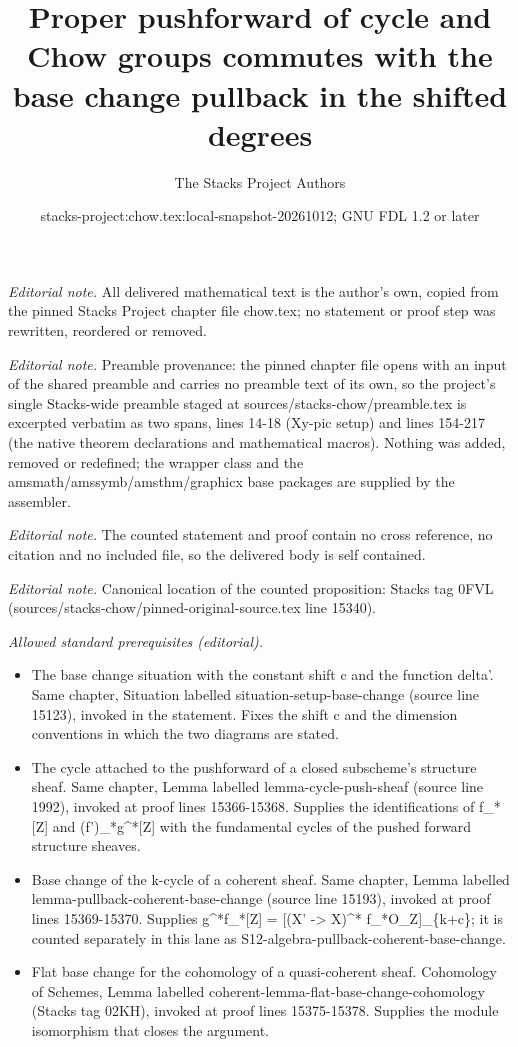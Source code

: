\documentclass[10pt,a4paper]{amsart}
\title{Proper pushforward of cycle and Chow groups commutes with the base change pullback in the shifted degrees}
\author{The Stacks Project Authors}
\date{stacks-project:chow.tex:local-snapshot-20261012; GNU FDL 1.2 or later}
\theoremstyle{plain}
\theoremstyle{definition}
\theoremstyle{remark}
\numberwithin{equation}{subsection}
\begin{document}
\maketitle
\noindent\textit{Editorial note.} All delivered mathematical text is the author's own, copied from the pinned Stacks Project chapter file chow.tex; no statement or proof step was rewritten, reordered or removed.\par\medskip
\noindent\textit{Editorial note.} Preamble provenance: the pinned chapter file opens with an input of the shared preamble and carries no preamble text of its own, so the project's single Stacks-wide preamble staged at sources/stacks-chow/preamble.tex is excerpted verbatim as two spans, lines 14-18 (Xy-pic setup) and lines 154-217 (the native theorem declarations and mathematical macros). Nothing was added, removed or redefined; the wrapper class and the amsmath/amssymb/amsthm/graphicx base packages are supplied by the assembler.\par\medskip
\noindent\textit{Editorial note.} The counted statement and proof contain no cross reference, no citation and no included file, so the delivered body is self contained.\par\medskip
\noindent\textit{Editorial note.} Canonical location of the counted proposition: Stacks tag 0FVL (sources/stacks-chow/pinned-original-source.tex line 15340).\par\medskip
\noindent\textit{Allowed standard prerequisites (editorial).}\begin{itemize}
\item The base change situation with the constant shift c and the function delta'. Same chapter, Situation labelled situation-setup-base-change (source line 15123), invoked in the statement. Fixes the shift c and the dimension conventions in which the two diagrams are stated.
\item The cycle attached to the pushforward of a closed subscheme's structure sheaf. Same chapter, Lemma labelled lemma-cycle-push-sheaf (source line 1992), invoked at proof lines 15366-15368. Supplies the identifications of f\_*[Z] and (f')\_*g\textasciicircum{}*[Z] with the fundamental cycles of the pushed forward structure sheaves.
\item Base change of the k-cycle of a coherent sheaf. Same chapter, Lemma labelled lemma-pullback-coherent-base-change (source line 15193), invoked at proof lines 15369-15370. Supplies g\textasciicircum{}*f\_*[Z] = [(X' -> X)\textasciicircum{}* f\_*O\_Z]\_\{k+c\}; it is counted separately in this lane as S12-algebra-pullback-coherent-base-change.
\item Flat base change for the cohomology of a quasi-coherent sheaf. Cohomology of Schemes, Lemma labelled coherent-lemma-flat-base-change-cohomology (Stacks tag 02KH), invoked at proof lines 15375-15378. Supplies the module isomorphism that closes the argument.
\end{itemize}\medskip
\end{document}
